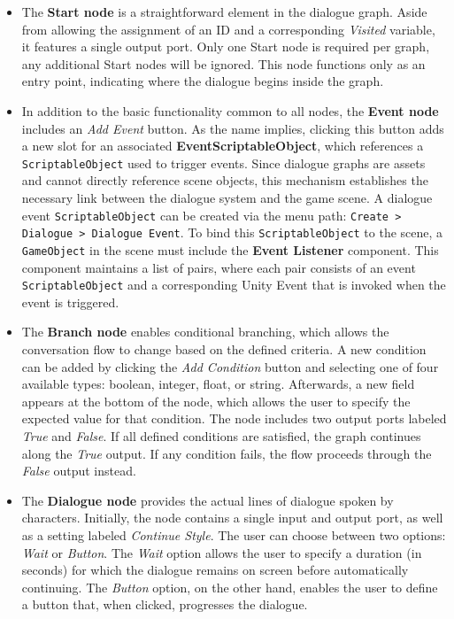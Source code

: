 \begin{itemize}
    \item The \textbf{Start node }is a straightforward element in the dialogue graph. Aside from allowing the assignment of an ID and a corresponding \textit{Visited} variable, it features a single output port. Only one Start node is required per graph, any additional Start nodes will be ignored. This node functions only as an entry point, indicating where the dialogue begins inside the graph.
    \item In addition to the basic functionality common to all nodes, the \textbf{Event node} includes an \textit{Add Event} button. As the name implies, clicking this button adds a new slot for an associated \textbf{EventScriptableObject}, which references a \verb|ScriptableObject| used to trigger events. Since dialogue graphs are assets and cannot directly reference scene objects, this mechanism establishes the necessary link between the dialogue system and the game scene. A dialogue event \verb|ScriptableObject| can be created via the menu path: \verb|Create > Dialogue > Dialogue Event|. To bind this \verb|ScriptableObject| to the scene, a \verb|GameObject| in the scene must include the \textbf{Event Listener} component. This component maintains a list of pairs, where each pair consists of an event \verb|ScriptableObject| and a corresponding Unity Event that is invoked when the event is triggered. 
    \item The \textbf{Branch node} enables conditional branching, which allows the conversation flow to change based on the defined criteria. A new condition can be added by clicking the \textit{Add Condition} button and selecting one of four available types: boolean, integer, float, or string. Afterwards, a new field appears at the bottom of the node, which allows the user to specify the expected value for that condition. The node includes two output ports labeled \textit{True} and \textit{False}. If all defined conditions are satisfied, the graph continues along the \textit{True} output. If any condition fails, the flow proceeds through the \textit{False} output instead. 
    \item The \textbf{Dialogue node} provides the actual lines of dialogue spoken by characters. Initially, the node contains a single input and output port, as well as a setting labeled \textit{Continue Style}. The user can choose between two options: \textit{Wait} or \textit{Button}. The \textit{Wait} option allows the user to specify a duration (in seconds) for which the dialogue remains on screen before automatically continuing. The \textit{Button} option, on the other hand, enables the user to define a button that, when clicked, progresses the dialogue.


\end{itemize}
